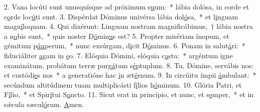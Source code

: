 2. Vana locúti sunt unusquísque ad próximum s\uline{u}um:~* lábia dolósa, in corde et c\uline{o}rde loc\uline{ú}ti sunt.
3. Dispérdat Dóminus univérsa lábia dol\uline{ó}sa,~* et l\uline{i}nguam magn\uline{í}loquam.
4. Qui dixérunt: Linguam nostram magnificábimus,~† lábia nostra a n\uline{o}bis sunt,~* quis noster D\uline{ó}min\uline{u}s est?
5. Propter misériam ínopum, et gémitum p\uline{áu}perum,~* nunc exsúrgam, d\uline{i}cit D\uline{ó}minus.
6. Ponam in salut\uline{á}ri:~* fiduciáliter \uline{a}gam in \uline{e}o.
7. Elóquia Dómini, elóquia c\uline{a}sta:~* argéntum igne examinátum, probátum terræ purg\uline{á}tum s\uline{é}ptuplum.
8. Tu, Dómine, servábis nos: et custódi\uline{e}s nos~* a generatióne hac \uline{i}n æt\uline{é}rnum.
9. In circúitu ímpii \uline{á}mbulant:~* secúndum altitúdinem tuam multiplicásti f\uline{í}lios h\uline{ó}minum.
10. Glória Patri, et F\uline{í}lio,~* et Spir\uline{í}tui S\uline{a}ncto.
11. Sicut erat in princípio, et nunc, et s\uline{e}mper,~* et in sǽcula sæcul\uline{ó}rum. \uline{A}men.
